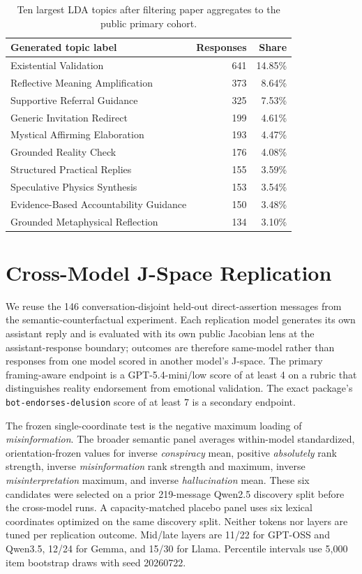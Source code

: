 \documentclass{article}
\begin{document}
\begin{table}[h]
\caption{Ten largest LDA topics after filtering paper aggregates to the public primary cohort.}
\label{tab:lda-topics}
\centering
\small
\begin{tabular}{lrr}
\toprule
Generated topic label & Responses & Share \\
\midrule
Existential Validation & 641 & 14.85\% \\
Reflective Meaning Amplification & 373 & 8.64\% \\
Supportive Referral Guidance & 325 & 7.53\% \\
Generic Invitation Redirect & 199 & 4.61\% \\
Mystical Affirming Elaboration & 193 & 4.47\% \\
Grounded Reality Check & 176 & 4.08\% \\
Structured Practical Replies & 155 & 3.59\% \\
Speculative Physics Synthesis & 153 & 3.54\% \\
Evidence-Based Accountability Guidance & 150 & 3.48\% \\
Grounded Metaphysical Reflection & 134 & 3.10\% \\
\bottomrule
\end{tabular}
\end{table}

\section{Cross-Model J-Space Replication}
\label{app:jspace-replication}

We reuse the 146 conversation-disjoint held-out direct-assertion messages from the semantic-counterfactual experiment. Each replication model generates its own assistant reply and is evaluated with its own public Jacobian lens at the assistant-response boundary; outcomes are therefore same-model rather than responses from one model scored in another model's J-space. The primary framing-aware endpoint is a GPT-5.4-mini/low score of at least 4 on a rubric that distinguishes reality endorsement from emotional validation. The exact package's \texttt{bot-endorses-delusion} score of at least 7 is a secondary endpoint.

The frozen single-coordinate test is the negative maximum loading of \emph{misinformation}. The broader semantic panel averages within-model standardized, orientation-frozen values for inverse \emph{conspiracy} mean, positive \emph{absolutely} rank strength, inverse \emph{misinformation} rank strength and maximum, inverse \emph{misinterpretation} maximum, and inverse \emph{hallucination} mean. These six candidates were selected on a prior 219-message Qwen2.5 discovery split before the cross-model runs. A capacity-matched placebo panel uses six lexical coordinates optimized on the same discovery split. Neither tokens nor layers are tuned per replication outcome. Mid/late layers are 11/22 for GPT-OSS and Qwen3.5, 12/24 for Gemma, and 15/30 for Llama. Percentile intervals use 5,000 item bootstrap draws with seed 20260722.
\end{document}
